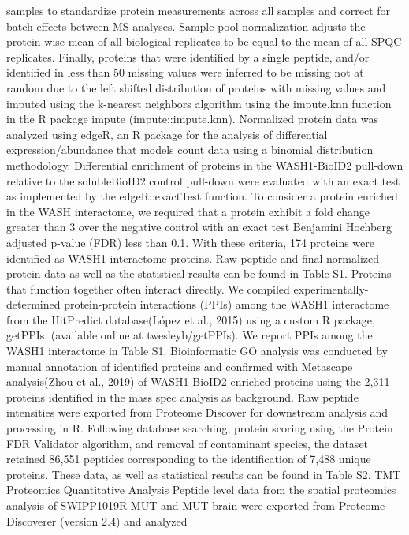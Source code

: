 samples to standardize protein measurements across all samples and correct for
batch effects between MS analyses. Sample pool normalization adjusts the
protein-wise mean of all biological replicates to be equal to the mean of all
SPQC replicates. Finally, proteins that were identified by a single peptide,
and/or identified in less than 50%
missing values were inferred to be missing not at random due to the left shifted
distribution of proteins with missing values and imputed using the k-nearest
neighbors algorithm using the impute.knn function in the R package impute
(impute::impute.knn). Normalized protein data was analyzed using edgeR, an R
package for the analysis of differential expression/abundance that models count
data using a binomial distribution methodology. Differential enrichment of
proteins in the WASH1-BioID2 pull-down relative to the solubleBioID2 control
pull-down were evaluated with an exact test as implemented by the
edgeR::exactTest function. To consider a protein enriched in the WASH
interactome, we required that a protein exhibit a fold change greater than 3
over the negative control with an exact test Benjamini Hochberg adjusted p-value
(FDR) less than 0.1. With these criteria, 174 proteins were identified as WASH1
interactome proteins. Raw peptide and final normalized protein data as well as
the statistical results can be found in Table S1.
	Proteins that function together often interact directly. We compiled
experimentally-determined protein-protein interactions (PPIs) among the WASH1
interactome from the HitPredict database(López et al., 2015) using a custom R
package, getPPIs, (available online at twesleyb/getPPIs). We report PPIs among
the WASH1 interactome in Table S1.
Bioinformatic GO analysis was conducted by manual annotation of identified
proteins and confirmed with Metascape analysis(Zhou et al., 2019) of
WASH1-BioID2 enriched proteins using the 2,311 proteins identified in the mass
spec analysis as background.  
Raw peptide intensities were exported from Proteome Discover for downstream
analysis and processing in R. Following database searching, protein scoring
using the Protein FDR Validator algorithm, and removal of contaminant species,
the dataset retained 86,551 peptides corresponding to the identification of
7,488 unique proteins. These data, as well as statistical results can be found
in Table S2.
TMT Proteomics Quantitative Analysis 
Peptide level data from the spatial proteomics analysis of SWIPP1019R MUT and
MUT brain were exported from Proteome Discoverer (version 2.4) and analyzed
